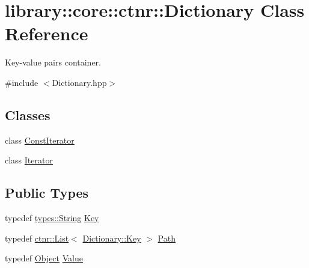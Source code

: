 \hypertarget{classlibrary_1_1core_1_1ctnr_1_1_dictionary}{}\section{library\+::core\+::ctnr\+::Dictionary Class Reference}
\label{classlibrary_1_1core_1_1ctnr_1_1_dictionary}


Key-\/value pairs container.  




{\ttfamily \#include $<$Dictionary.\+hpp$>$}

\subsection*{Classes}
\begin{DoxyCompactItemize}
\item 
class \mbox{\hyperlink{classlibrary_1_1core_1_1ctnr_1_1_dictionary_1_1_const_iterator}{Const\+Iterator}}
\item 
class \mbox{\hyperlink{classlibrary_1_1core_1_1ctnr_1_1_dictionary_1_1_iterator}{Iterator}}
\end{DoxyCompactItemize}
\subsection*{Public Types}
\begin{DoxyCompactItemize}
\item 
typedef \mbox{\hyperlink{classlibrary_1_1core_1_1types_1_1_string}{types\+::\+String}} \mbox{\hyperlink{classlibrary_1_1core_1_1ctnr_1_1_dictionary_a987cae687cce70d81a2a483c5e05e842}{Key}}
\item 
typedef \mbox{\hyperlink{namespacelibrary_1_1core_1_1ctnr_a87ccf40619002299b341a5e76e989912}{ctnr\+::\+List}}$<$ \mbox{\hyperlink{classlibrary_1_1core_1_1ctnr_1_1_dictionary_a987cae687cce70d81a2a483c5e05e842}{Dictionary\+::\+Key}} $>$ \mbox{\hyperlink{classlibrary_1_1core_1_1ctnr_1_1_dictionary_a5240b2a04a39b841ed81e52e962f0cbf}{Path}}
\item 
typedef \mbox{\hyperlink{classlibrary_1_1core_1_1ctnr_1_1_object}{Object}} \mbox{\hyperlink{classlibrary_1_1core_1_1ctnr_1_1_dictionary_a3baf6692694e4fc27cb399ac083c88ea}{Value}}
\end{DoxyCompactItemize}
